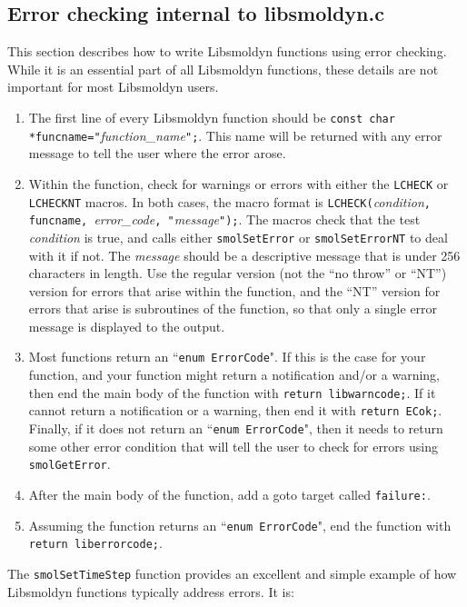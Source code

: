 \documentclass {book}
\newcommand {\ttt} {\texttt}
\begin{document}
\subsection*{Error checking internal to libsmoldyn.c}

This section describes how to write Libsmoldyn functions using error checking. While it is an essential part of all Libsmoldyn functions, these details are not important for most Libsmoldyn users.

\begin{enumerate}
\item The first line of every Libsmoldyn function should be \ttt{const char *funcname="}\emph{function\_name}\ttt{";}. This name will be returned with any error message to tell the user where the error arose.
\item Within the function, check for warnings or errors with either the \ttt{LCHECK} or \ttt{LCHECKNT} macros. In both cases, the macro format is \ttt{LCHECK(}\emph{condition}\ttt{, funcname, }\emph{error\_code}\ttt{, "}\emph{message}\ttt{");}. The macros check that the test \emph{condition} is true, and calls either \ttt{smolSetError} or \ttt{smolSetErrorNT} to deal with it if not. The \emph{message} should be a descriptive message that is under 256 characters in length. Use the regular version (not the ``no throw'' or ``NT'') version for errors that arise within the function, and the ``NT'' version for errors that arise is subroutines of the function, so that only a single error message is displayed to the output.
\item Most functions return an ``\ttt{enum ErrorCode}". If this is the case for your function, and your function might return a notification and/or a warning, then end the main body of the function with \ttt{return libwarncode;}. If it cannot return a notification or a warning, then end it with \ttt{return ECok;}. Finally, if it does not return an ``\ttt{enum ErrorCode}", then it needs to return some other error condition that will tell the user to check for errors using \ttt{smolGetError}.
\item After the main body of the function, add a goto target called \ttt{failure:}.
\item Assuming the function returns an ``\ttt{enum ErrorCode}", end the function with \ttt{return liberrorcode;}.
\end{enumerate}

The \ttt{smolSetTimeStep} function provides an excellent and simple example of how Libsmoldyn functions typically address errors. It is:
\end{document}
